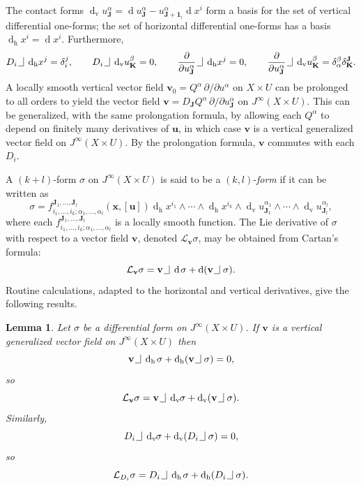 \documentclass[11pt]{article} %
\numberwithin{equation}{section}
\newcommand{\intpsym}{\,\, \setlength{\unitlength}{0.4mm}
	\begin{picture}(0, 0)(5, 5)%
	\put(0, 4){\line(1,0){5}} \put(5,4){\line(0,1){8}}
	\end{picture}\,\,}
\newcommand{\intp}{\,\,\intpsym}
\newcommand{\upd}{\operatorname{d}}
\newcommand{\uph}{\operatorname{h}}
\newcommand{\upv}{\operatorname{v}}
\newcommand{\p}{\partial}
\newcommand{\dv}{\upd_{\upv}\!}
\newcommand{\mbu}{\mathbf{u}}
\newcommand{\mbv}{\mathbf{v}}
\newcommand{\mbx}{\mathbf{x}}
\newcommand{\mbJ}{\mathbf{J}}
\newcommand{\mbK}{\mathbf{K}}
\newcommand{\mcL}{\mathcal{L}}
\theoremstyle{plain}
\newtheorem{lem}[thm]{Lemma}
\theoremstyle{definition}
\begin{document}
The contact forms $\dv u^{\alpha}_{\mbJ}=\upd\!u^{\alpha}_{\mbJ}-u^{\alpha}_{\mbJ+\mathbf{1}_i}\!\upd\!x^i$ form a basis for the set of vertical differential one-forms; the set of horizontal differential one-forms has a basis $\upd_{\uph}\!x^i=\upd\!x^i$. Furthermore,
\begin{equation}\label{vec1}
D_i\intp \upd_{\uph}\!x^j=\delta^j_i,\qquad D_i\intp \dv u^\beta_\mbK=0,\qquad \frac{\partial}{\partial u^{\alpha}_{\mbJ}}\intp \upd_{\uph}\!x^j=0,\qquad \frac{\partial}{\partial u^{\alpha}_{\mbJ}}\intp \dv u^\beta_\mbK=\delta^\beta_\alpha\delta^\mbJ_\mbK.
\end{equation}
A locally smooth vertical vector field $\mbv_0=Q^\alpha\,\p/\p u^\alpha$ on $X\times U$ can be prolonged to all orders to yield the vector field $\mbv=D_{\mbJ}Q^\alpha\,\p/\p u^\alpha_{\mbJ}$ on $J^{\infty}(X\times U)$. This can be generalized, with the same prolongation formula, by allowing each $Q^\alpha$ to depend on finitely many derivatives of $\mbu$, in which case $\mbv$ is a vertical generalized vector field on $J^{\infty}(X\times U)$. By the prolongation formula, $\mbv$ commutes with each $D_i$. 

A $(k+l)$-form  $\sigma$ on $J^{\infty}(X\times U)$ is said to be a $(k,l)$-\textit{form} if it can be written as 
\begin{equation}
\sigma=f_{i_1,\ldots,i_k;\alpha_1,\ldots,\alpha_l}^{\mbJ_1,\ldots,\mbJ_l}(\mbx,[\mbu])\upd_{\uph}\!x^{i_1}\wedge \cdots \wedge \upd_{\uph}\!x^{i_k}\wedge \dv  u_{\mbJ_1}^{\alpha_1}\wedge\cdots\wedge \dv u_{\mbJ_l}^{\alpha_l},
\end{equation}
where each $f_{i_1,\ldots,i_k;\alpha_1,\ldots,\alpha_l}^{\mbJ_1,\ldots,\mbJ_l}$ is a locally smooth function.
The Lie derivative of $\sigma$ with respect to a vector field $\mbv$, denoted $\mcL_\mbv \sigma$, may be obtained from Cartan's formula:
\begin{equation}
\mcL_\mbv \sigma=\mbv\intp\upd\;\!\!\sigma+\upd(\mbv\intp\sigma).
\end{equation}
Routine calculations, adapted to the horizontal and vertical derivatives, give the following results.
\begin{lem}
	Let $\sigma$ be a differential form on $J^{\infty}(X\times U)$. If $\mbv$ is a vertical generalized vector field on $J^{\infty}(X\times U)$ then
	\[
	\mbv\intp\upd_{\uph}\;\!\!\sigma+\upd_{\uph}(\mbv\intp\sigma)=0,
	\]
	so
	\[
	\mcL_\mbv\sigma=\mbv\intp\dv \;\!\!\sigma+\dv\,(\mbv\intp\sigma).
	\]
	Similarly,
\[
D_i\intp\dv \;\!\!\sigma+\dv\,(D_i\intp\sigma)=0,
\]
so
\[
\mcL_{D_i} \sigma=D_i\intp\upd_{\uph}\;\!\!\sigma+\upd_{\uph}(D_i\intp\sigma).
\]	
\end{lem}
\end{document}
